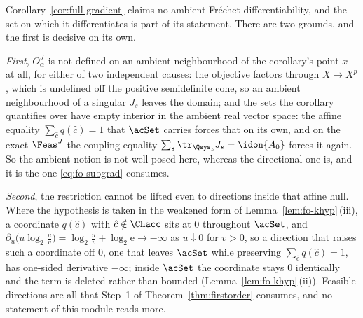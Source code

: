 
\begin{remark}\label{rem:directional-differentiability}
Corollary~\ref{cor:full-gradient} claims no ambient Fr\'echet
differentiability, and the set on which it differentiates is part of its
statement. There are two grounds, and the first is decisive on its own.

\emph{First}, $O^{J}_{\alpha}$ is not defined on an ambient neighbourhood
of the corollary's point $x$ at all, for either of two independent causes: the objective
factors through $X\mapsto X^{p}$, which is undefined off the positive
semidefinite cone, so an ambient neighbourhood of a singular $J_s$ leaves
the domain; and the sets the corollary quantifies over have empty
interior in the ambient real vector space: the affine equality
$\sum_{\hat c}q(\hat c)=1$ that $\acSet$ carries forces that on its own,
and on the exact $\Feas^{J}$ the coupling equality
$\sum_s\tr_{\Qsys_s}J_s=\idon{A_0}$ forces it again. So the ambient notion
is not well posed here, whereas the directional one is, and it is the one
\eqref{eq:fo-subgrad} consumes.

\emph{Second}, the restriction cannot be lifted even to directions inside
that affine hull. Where the hypothesis is taken in the weakened form of
Lemma~\ref{lem:fo-khyp}\,(iii), a coordinate $q(\hat c)$ with
$\hat c\notin\Chacc$ sits at $0$ throughout $\acSet$, and
$\partial_u\big(u\log_2\tfrac uv\big)=\log_2\tfrac uv+\log_2\mathrm e
\to-\infty$ as $u\downarrow0$ for $v>0$, so a direction that raises such a
coordinate off $0$, one that leaves $\acSet$ while preserving
$\sum_{\hat c}q(\hat c)=1$, has one-sided derivative $-\infty$; inside
$\acSet$ the coordinate stays $0$ identically and the term is deleted
rather than bounded (Lemma~\ref{lem:fo-khyp}\,(ii)). Feasible directions
are all that Step~1 of Theorem~\ref{thm:firstorder} consumes, and no
statement of this module reads more.
\end{remark}
